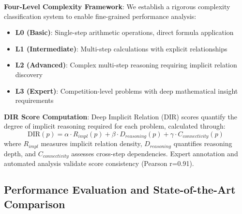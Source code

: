 \textbf{Four-Level Complexity Framework}: We establish a rigorous complexity classification system to enable fine-grained performance analysis:

\begin{itemize}
    \item \textbf{L0 (Basic)}: Single-step arithmetic operations, direct formula application
    \item \textbf{L1 (Intermediate)}: Multi-step calculations with explicit relationships
    \item \textbf{L2 (Advanced)}: Complex multi-step reasoning requiring implicit relation discovery
    \item \textbf{L3 (Expert)}: Competition-level problems with deep mathematical insight requirements
\end{itemize}

\textbf{DIR Score Computation}: Deep Implicit Relation (DIR) scores quantify the degree of implicit reasoning required for each problem, calculated through:
\begin{equation}
\text{DIR}(p) = \alpha \cdot R_{impl}(p) + \beta \cdot D_{reasoning}(p) + \gamma \cdot C_{connectivity}(p)
\end{equation}
where $R_{impl}$ measures implicit relation density, $D_{reasoning}$ quantifies reasoning depth, and $C_{connectivity}$ assesses cross-step dependencies. Expert annotation and automated analysis validate score consistency (Pearson r=0.91).

\subsection{Performance Evaluation and State-of-the-Art Comparison}

